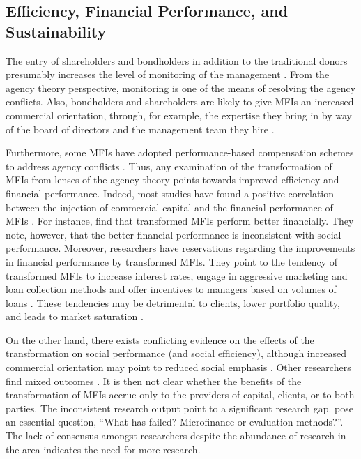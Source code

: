 \documentclass[a4paper,nobind]{templates/ociamthesis}
\begin{document}
\hypertarget{efficiency-financial-performance-and-sustainability}{%
\subsection{Efficiency, Financial Performance, and Sustainability}\label{efficiency-financial-performance-and-sustainability}}

\noindent The entry of shareholders and bondholders in addition to the traditional donors presumably increases the level of monitoring of the management \autocite{stoughton1998ipo}. From the agency theory perspective, monitoring is one of the means of resolving the agency conflicts. Also, bondholders and shareholders are likely to give MFIs an increased commercial orientation, through, for example, the expertise they bring in by way of the board of directors and the management team they hire \autocite{lauer2008transforming}.

Furthermore, some MFIs have adopted performance-based compensation schemes to address agency conflicts \autocite{bateman2010doesn}. Thus, any examination of the transformation of MFIs from lenses of the agency theory points towards improved efficiency and financial performance. Indeed, most studies have found a positive correlation between the injection of commercial capital and the financial performance of MFIs \autocite{ouis2013profit}. For instance, \textcite{daher2013microfinance} find that transformed MFIs perform better financially. They note, however, that the better financial performance is inconsistent with social performance.
Moreover, researchers have reservations regarding the improvements in financial performance by transformed MFIs. They point to the tendency of transformed MFIs to increase interest rates, engage in aggressive marketing and loan collection methods and offer incentives to managers based on volumes of loans \autocite{ghosh2013microfinance}. These tendencies may be detrimental to clients, lower portfolio quality, and leads to market saturation \autocite{hoque2011commercialization}.

On the other hand, there exists conflicting evidence on the effects of the transformation on social performance (and social efficiency), although increased commercial orientation may point to reduced social emphasis \autocite{cobb2016funding,daher2013microfinance}. Other researchers find mixed outcomes \autocite{abdulai2017trade}. It is then not clear whether the benefits of the transformation of MFIs accrue only to the providers of capital, clients, or to both parties. The inconsistent research output point to a significant research gap.\autocite{awaworyi2016has} pose an essential question, ``What has failed? Microfinance or evaluation methods?''. The lack of consensus amongst researchers despite the abundance of research in the area indicates the need for more research.
\end{document}
